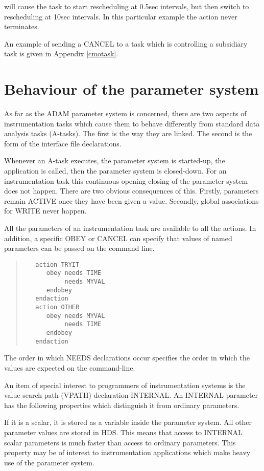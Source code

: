 \documentclass[twoside,11pt]{article}
\newcommand{\xlabel}[1]{}
\renewcommand{\_}{\texttt{\symbol{95}}}
\begin{document}
will cause the task to start rescheduling at 0.5sec intervals, but then 
switch to rescheduling at 10sec intervals. In this particular example 
the action never terminates.

An example of sending a CANCEL to a task which is controlling a 
subsidiary task is given in Appendix \ref{cmotask}.

\section{Behaviour of the parameter system
\xlabel{behaviour_of_the_parameter_system}}

As far as the ADAM parameter system is concerned, there are two aspects 
of instrumentation tasks which cause them to behave differently from 
standard data analysis tasks (A-tasks). The first is the way they are 
linked. The second is the form of the interface file declarations.

Whenever an A-task executes, the parameter system is started-up, the 
application is called, then the parameter system is closed-down. For an 
instrumentation task this continuous opening-closing of the parameter 
system does not happen. There are two obvious consequences of this. 
Firstly, parameters remain ACTIVE once they have been given a value. 
Secondly, global associations for WRITE never happen.

All the parameters of an instrumentation task are available to all the 
actions. In addition, a specific OBEY or CANCEL can specify that values 
of named parameters can be passed on the command line.

\small \begin{quote} \begin{verbatim}
   action TRYIT
      obey needs TIME
           needs MYVAL
      endobey
   endaction
   action OTHER
      obey needs MYVAL
           needs TIME
      endobey
   endaction
\end{verbatim} \end{quote} \normalsize

The order in which NEEDS declarations occur specifies the order in 
which the values are expected on the command-line.

An item of special interest to programmers of instrumentation systems is 
the value-search-path (VPATH) declaration INTERNAL. An INTERNAL 
parameter has the following properties which distinguish it from 
ordinary parameters.

If it is a scalar, it is stored as a variable inside the parameter 
system. All other parameter values are stored in HDS. This means that 
access to INTERNAL scalar parameters is much faster than access to 
ordinary parameters. This property may be of interest to instrumentation 
applications which make heavy use of the parameter system.
\end{document}

